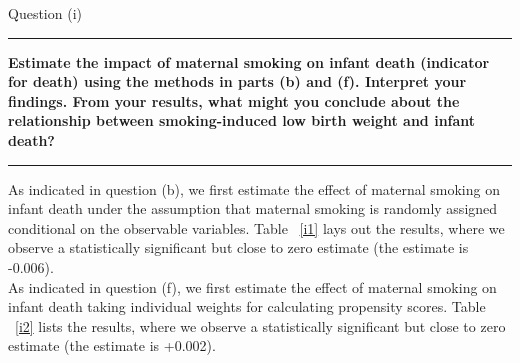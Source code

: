\documentclass[12pt]{article}
\newcommand\question[1]{\vspace{1em}\hrule\vspace{1em}\textbf{#1}\vspace{1em}\hrule\vspace{1em}}
\begin{document}
\newpage
\begin{center}\LARGE{Question (i)}\end{center}
\question{Estimate the impact of maternal smoking on infant death (indicator for death) using the methods in parts (b) and (f).  Interpret your findings.  From your results, what might you conclude about the relationship between smoking-induced low birth weight and infant death?}

As indicated in question (b), we first estimate the effect of maternal smoking on infant death under the assumption that maternal smoking is randomly assigned conditional on the observable variables. Table ~\ref{i1} lays out the results, where we observe a statistically significant but close to zero estimate (the estimate is -0.006).\\


As indicated in question (f), we first estimate the effect of maternal smoking on infant death taking individual weights for calculating propensity scores. Table ~\ref{i2} lists the results, where we observe a statistically significant but close to zero estimate (the estimate is +0.002).\\

\end{document}
